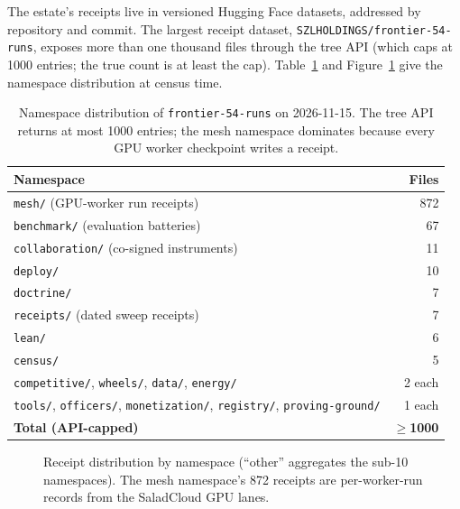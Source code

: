 ﻿\documentclass[11pt]{article}
\begin{document}
The estate's receipts live in versioned Hugging Face datasets, addressed by repository and commit. The largest receipt dataset, \texttt{SZLHOLDINGS/frontier-54-runs}, exposes more than one thousand files through the tree API (which caps at 1000 entries; the true count is at least the cap). Table~\ref{tab:namespaces} and Figure~\ref{fig:namespaces} give the namespace distribution at census time.

\begin{table}[htbp]
\centering
\small
\begin{tabular}{lr}
\toprule
\textbf{Namespace} & \textbf{Files} \\
\midrule
\texttt{mesh/} (GPU-worker run receipts) & 872 \\
\texttt{benchmark/} (evaluation batteries) & 67 \\
\texttt{collaboration/} (co-signed instruments) & 11 \\
\texttt{deploy/} & 10 \\
\texttt{doctrine/} & 7 \\
\texttt{receipts/} (dated sweep receipts) & 7 \\
\texttt{lean/} & 6 \\
\texttt{census/} & 5 \\
\texttt{competitive/}, \texttt{wheels/}, \texttt{data/}, \texttt{energy/} & 2 each \\
\texttt{tools/}, \texttt{officers/}, \texttt{monetization/}, \texttt{registry/}, \texttt{proving-ground/} & 1 each \\
\midrule
\textbf{Total (API-capped)} & \textbf{$\geq$1000} \\
\bottomrule
\end{tabular}
\caption{Namespace distribution of \texttt{frontier-54-runs} on 2026-11-15. The tree API returns at most 1000 entries; the mesh namespace dominates because every GPU worker checkpoint writes a receipt.}
\label{tab:namespaces}
\end{table}

\begin{figure}[htbp]
\centering
{}
\caption{Receipt distribution by namespace (\textquotedblleft other\textquotedblright{} aggregates the sub-10 namespaces). The mesh namespace's 872 receipts are per-worker-run records from the SaladCloud GPU lanes.}
\label{fig:namespaces}
\end{figure}
\end{document}

